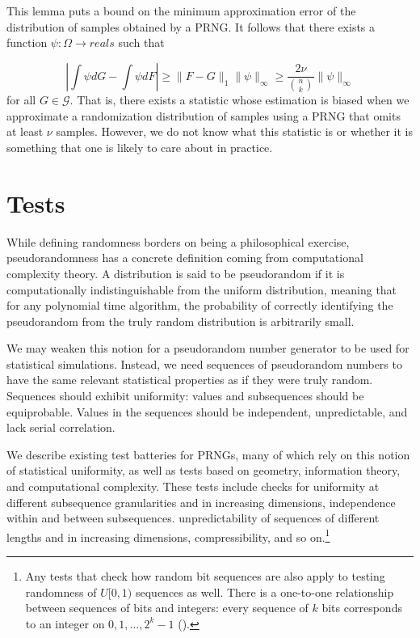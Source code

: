 \documentclass[12pt]{article}
\begin{document}
This lemma puts a bound on the minimum approximation error of the distribution of samples obtained by a PRNG.
It follows that there exists a function $\psi: \Omega \to reals$ such that


$$\left\lvert \int \psi dG - \int \psi dF \right\rvert \geq \lVert F - G \rVert_1 \lVert \psi \rVert_\infty \geq \frac{2\nu}{{n\choose k}} \lVert \psi \rVert_\infty$$
for all $G \in \mathcal{G}$.
That is, there exists a statistic whose estimation is biased when we approximate a randomization distribution of samples using a PRNG that omits at least $\nu$ samples.
However, we do not know what this statistic is or whether it is something that one is likely to care about in practice.




\section{Tests}\label{sec:tests}
While defining randomness borders on being a philosophical exercise, pseudorandomness has a concrete definition coming from computational complexity theory.
A distribution is said to be pseudorandom if it is computationally indistinguishable from the uniform distribution,
meaning that for any polynomial time algorithm, the probability of correctly identifying the pseudorandom from the truly random distribution is arbitrarily small.

We may weaken this notion for a pseudorandom number generator to be used for statistical simulations.
Instead, we need sequences of pseudorandom numbers to have the same relevant statistical properties as if they were truly random.
Sequences should exhibit uniformity: values and subsequences should be equiprobable.
Values in the sequences should be independent, unpredictable, and lack serial correlation.

We describe existing test batteries for PRNGs, many of which rely on this notion of statistical uniformity, as well as tests based on geometry, information theory, and computational complexity.
These tests include checks for uniformity at different subsequence granularities and in increasing dimensions,
independence within and between subsequences.
unpredictability of sequences of different lengths and in increasing dimensions,
compressibility, and so on.\footnote{
Any tests that check how random bit sequences are also apply to testing randomness of $U[0,1)$ sequences as well.
There is a one-to-one relationship between sequences of bits and integers:
every sequence of $k$ bits corresponds to an integer on $0, 1, \dots, 2^k-1$ (\cite{lecuyer_testu01_2007}).
}
\end{document}
